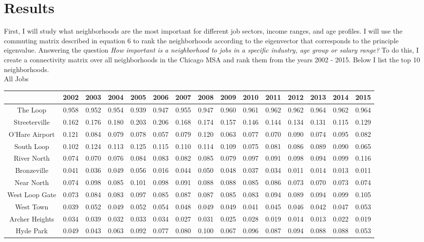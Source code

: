 \documentclass{article}
\theoremstyle{definition}
\theoremstyle{remark}
\begin{document}
\section{Results}

First, I will study what neighborhoods are the most important for different job sectors, income ranges, and age profiles.  I will use the commuting matrix described in equation 6 to rank the neighborhoods according to the eigenvector that corresponds to the principle eigenvalue.  Answering the question \textit{How important is a neighborhood to jobs in a specific industry, age group or salary range?}  To do this, I create a connectivity matrix over all neighborhoods in the Chicago MSA and rank them from the years 2002 - 2015.  Below I list the top 10 neighborhoods. \\

All Jobs \\
\begin{adjustbox}{center}
\begin{tabular}{||c | c c c c c c c c c c c c c c ||} 
 \hline
 & 2002 & 2003 & 2004 & 2005 & 2006 & 2007 & 2008 & 2009 & 2010 & 2011 & 2012 & 2013 & 2014 & 2015\\[0.5ex] 
 \hline\hline
The Loop & 0.958 & 0.952 & 0.954 & 0.939 & 0.947 & 0.955 & 0.947 & 0.960 & 0.961 & 0.962 & 0.962 & 0.964 & 0.962 & 0.964 \\
Streeterville & 0.162 & 0.176 & 0.180 & 0.203 & 0.206 & 0.168 & 0.174 & 0.157 & 0.146 & 0.144 & 0.134 & 0.131 & 0.115 & 0.129 \\
O'Hare Airport & 0.121 & 0.084 & 0.079 & 0.078 & 0.057 & 0.079 & 0.120 & 0.063 & 0.077 & 0.070 & 0.090 & 0.074 & 0.095 & 0.082 \\
South Loop & 0.102 & 0.124 & 0.113 & 0.125 & 0.115 & 0.110 & 0.114 & 0.109 & 0.075 & 0.081 & 0.086 & 0.089 & 0.090 & 0.065 \\
River North & 0.074 & 0.070 & 0.076 & 0.084 & 0.083 & 0.082 & 0.085 & 0.079 & 0.097 & 0.091 & 0.098 & 0.094 & 0.099 & 0.116 \\
Bronzeville & 0.041 & 0.036 & 0.049 & 0.056 & 0.016 & 0.044 & 0.050 & 0.048 & 0.037 & 0.034 & 0.011 & 0.014 & 0.013 & 0.011 \\
Near North & 0.074 & 0.098 & 0.085 & 0.101 & 0.098 & 0.091 & 0.088 & 0.088 & 0.085 & 0.086 & 0.073 & 0.070 & 0.073 & 0.074 \\
West Loop Gate & 0.073 & 0.084 & 0.083 & 0.097 & 0.085 & 0.087 & 0.087 & 0.085 & 0.083 & 0.094 & 0.089 & 0.094 & 0.099 & 0.105 \\
West Town & 0.039 & 0.052 & 0.049 & 0.052 & 0.054 & 0.048 & 0.049 & 0.049 & 0.041 & 0.045 & 0.046 & 0.042 & 0.047 & 0.053 \\
Archer Heights & 0.034 & 0.039 & 0.032 & 0.033 & 0.034 & 0.027 & 0.031 & 0.025 & 0.028 & 0.019 & 0.014 & 0.013 & 0.022 & 0.019  \\
Hyde Park & 0.049 & 0.043 & 0.063 & 0.092 & 0.077 & 0.080 & 0.100 & 0.067 & 0.096 & 0.087 & 0.094 & 0.088 & 0.088 & 0.053  \\
 \hline
 \end{tabular}
\end{adjustbox}
\\
\end{document}
